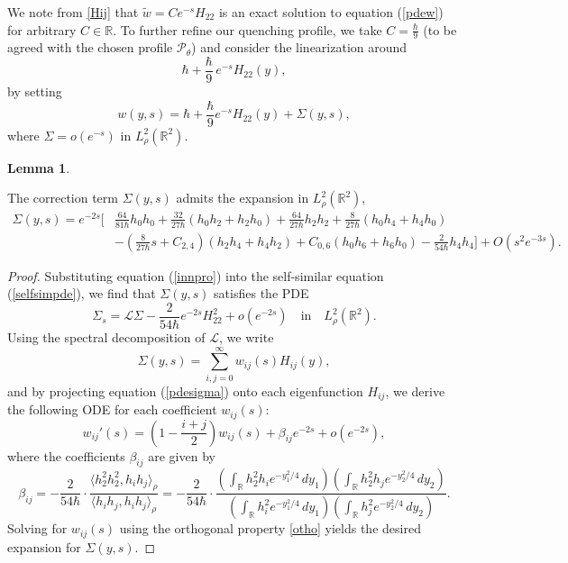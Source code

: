 \documentclass[11pt,reqno]{amsart}
\theoremstyle{definition}
\theoremstyle{bfremark}
\newtheorem{lemma}{Lemma}[section]
\numberwithin{equation}{section}
\begin{document}
We note from \eqref{Hij} that \(\widetilde{w} = C e^{-s} H_{22}\) is an exact solution to equation (\ref{pdew}) for arbitrary $C \in \mathbb{R}$. To further refine our quenching profile, we take $C = \frac{\hbar}{9}$ (to be agreed with the chosen profile $\mathcal{P}_{\theta}$) and consider the linearization around 
\[
    \hbar + \frac{\hbar}{9}\, e^{-s} H_{22}(y),
\]
by setting
\begin{equation}
    w(y,s) = \hbar + \frac{\hbar}{9} e^{-s} H_{22}(y) + \Sigma(y,s),\label{innpro}
\end{equation}
where \(\Sigma = o(e^{-s})\) in \(L^2_{\rho}(\mathbb{R}^2)\).
\begin{lemma}
\label{Lemma 2.1}

The correction term \(\Sigma(y,s)\) admits the expansion in $L^2_\rho(\mathbb{R}^2)$,
\begin{align*}
    \Sigma(y,s) = e^{-2s} \Bigg[ 
        &\frac{64}{81\hbar} h_0 h_0 
        + \frac{32}{27\hbar} (h_0 h_2 + h_2 h_0) 
        + \frac{64}{27\hbar} h_2 h_2 
        + \frac{8}{27\hbar} (h_0 h_4 + h_4 h_0) \\
        &- \left( \frac{8}{27 \hbar} s + C_{2,4} \right)(h_2 h_4 + h_4 h_2) 
        + C_{0,6} (h_0 h_6 + h_6 h_0) 
        - \frac{2}{54\hbar} h_4 h_4 
    \Bigg] + O(s^2 e^{-3s}).
\end{align*}
\end{lemma}

\begin{proof}
Substituting equation (\ref{innpro}) into the self-similar equation (\ref{selfsimpde}), we find that \(\Sigma(y,s)\) satisfies the PDE
\begin{equation}
    \Sigma_s = \mathcal{L} \Sigma - \frac{2}{54\hbar} e^{-2s} H_{22}^2 + o(e^{-2s}) 
    \quad \text{in} \quad L^2_{\rho}(\mathbb{R}^2).\label{pdesigma}
\end{equation}
Using the spectral decomposition of \(\mathcal{L}\), we write
\[
    \Sigma(y,s) = \sum_{i,j=0}^{\infty} w_{ij}(s) H_{ij}(y),
\]
and by projecting equation (\ref{pdesigma}) onto each eigenfunction \(H_{ij}\), we derive the following ODE for each coefficient \(w_{ij}(s)\):
\[
    w_{ij}'(s) = \left(1 - \frac{i+j}{2} \right) w_{ij}(s) + \beta_{ij} e^{-2s} + o(e^{-2s}),
\]
where the coefficients \(\beta_{ij}\) are given by
\[
    \beta_{ij} = - \frac{2}{54\hbar} \cdot \frac{
        \langle h_2^2 h_2^2, h_i h_j \rangle_{\rho}
    }{
        \langle h_i h_j, h_i h_j \rangle_{\rho}
    } 
    = -\frac{2}{54\hbar} \cdot \frac{
        \left( \int_{\mathbb{R}} h_2^2 h_i e^{-y_1^2/4} \, dy_1 \right)
        \left( \int_{\mathbb{R}} h_2^2 h_j e^{-y_2^2/4} \, dy_2 \right)
    }{
        \left( \int_{\mathbb{R}} h_i^2 e^{-y_1^2/4} \, dy_1 \right)
        \left( \int_{\mathbb{R}} h_j^2 e^{-y_2^2/4} \, dy_2 \right)
    }.
\]
Solving for \(w_{ij}(s)\) using the orthogonal property \ref{otho} yields the desired expansion for \(\Sigma(y,s)\).
\end{proof}
\end{document}
